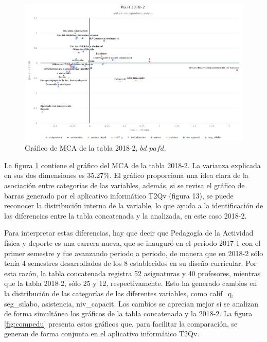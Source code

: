 \documentclass[mathematics,article,submit,moreauthors,pdftex]{mdpi}
\begin{document}
\begin{figure}[H]


\begin{center}\includegraphics[width=0.9\linewidth,]{point2018_edu} \end{center}

\caption{Gráfico de MCA de la tabla 2018-2, $bd$ $pafd$.}
\label{fig:point2018edu}
\end{figure}

La figura \ref{fig:point2018edu} contiene el gráfico del MCA de la tabla
2018-2. La varianza explicada en sus dos dimensiones es 35.27\%. El
gráfico proporciona una idea clara de la asociación entre categorías de
las variables, además, si se revisa el gráfico de barras generado por el
aplicativo informático T2Qv (figura 13), se puede reconocer la
distribución interna de la variable, lo que ayuda a la identificación de
las diferencias entre la tabla concatenada y la analizada, en este caso
2018-2.

Para interpretar estas diferencias, hay que decir que Pedagogía de la
Actividad física y deporte es una carrera nueva, que se inauguró en el
periodo 2017-1 con el primer semestre y fue avanzando periodo a periodo,
de manera que en 2018-2 sólo tenía 4 semestres desarrollados de los 8
establecidos en su diseño curricular. Por esta razón, la tabla
concatenada registra 52 asignaturas y 40 profesores, mientras que la
tabla 2018-2, sólo 25 y 12, respectivamente. Esto ha generado cambios en
la distribución de las categorías de las diferentes variables, como
calif\_q, seg\_silabo, asistencia, niv\_capacit. Los cambios se aprecian
mejor si se analizan de forma simultánea los gráficos de la tabla
concatenada y la 2018-2. La figura \ref{fig:compedu} presenta estos
gráficos que, para facilitar la comparación, se generan de forma
conjunta en el aplicativo informático T2Qv.
\end{document}
